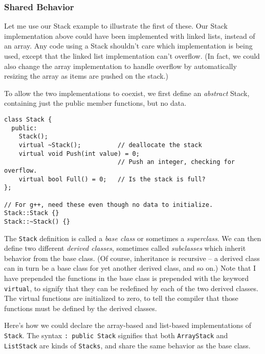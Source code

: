 \subsubsection{Shared Behavior}

Let me use our Stack example to illustrate the first of these.
Our Stack implementation 
above could have been implemented with linked lists, instead of an array.
Any code using a Stack shouldn't
care which implementation is being used, except that the linked list
implementation can't overflow. (In fact, we could also change the
array implementation to handle overflow by automatically resizing
the array as items are pushed on the stack.)

To allow the two implementations to coexist, we first define an
{\em abstract} Stack, containing just the public member functions, 
but no data.

\begin{verbatim}
class Stack {
  public:
    Stack();
    virtual ~Stack();          // deallocate the stack
    virtual void Push(int value) = 0; 
                               // Push an integer, checking for overflow.
    virtual bool Full() = 0;   // Is the stack is full?
};

// For g++, need these even though no data to initialize.
Stack::Stack {}             
Stack::~Stack() {}
\end{verbatim}

The {\tt Stack} definition is called a {\em base class} or sometimes a {\em
superclass}.  We can then define two different {\em derived classes}, 
sometimes called {\em subclasses} which inherit behavior from the base
class.  (Of course, inheritance is recursive -- a derived class can in 
turn be a base class for yet another derived class, and so on.)
Note that I have prepended the functions in the base class is prepended 
with the keyword {\tt virtual}, to signify that they can be redefined by 
each of the two derived classes.  The virtual functions are
initialized to zero, to tell the compiler that those functions
must be defined by the derived classes.

Here's how we could declare the array-based and list-based
implementations of {\tt Stack}. The syntax {\tt : public Stack} signifies 
that both {\tt ArrayStack} and {\tt ListStack} are kinds 
of {\tt Stacks}, and share the same behavior as the base class.

